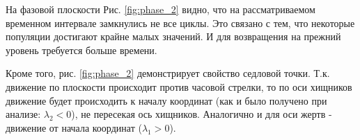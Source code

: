На фазовой плоскости Рис. \ref{fig:phase_2} видно, что на рассматриваемом временном интервале замкнулись не все циклы. 
Это связано с тем, что некоторые популяции достигают крайне малых значений. И для возвращения на прежний уровень требуется больше времени.

Кроме того, рис. \ref{fig:phase_2} демонстрирует свойство седловой точки. Т.к. движение по плоскости происходит против часовой стрелки, то по оси хищников движение будет происходить к началу координат (как и было получено при анализе: $\lambda_2 < 0$), не пересекая ось хищников. Аналогично и для оси жертв - движение от начала координат ($\lambda_1 > 0$).